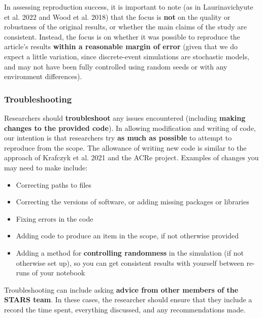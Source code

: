 In assessing reproduction success, it is important to note (as in Laurinavichyute et al. 2022\autocite{laurinavichyute_share_2022} and Wood et al. 2018\autocite{wood_push_2018}) that the focus is \textbf{not} on the quality or robustness of the original results, or whether the main claims of the study are consistent. Instead, the focus is on whether it was possible to reproduce the article's results \textbf{within a reasonable margin of error} (given that we do expect a little variation, since discrete-event simulations are stochastic models, and may not have been fully controlled using random seeds or with any environment differences).

\vspace{0.5cm}
\subsubsection{Troubleshooting}

Researchers should \textbf{troubleshoot} any issues encountered (including \textbf{making changes to the provided code}). In allowing modification and writing of code, our intention is that researchers try \textbf{as much as possible} to attempt to reproduce from the scope. The allowance of writing new code is similar to the approach of Krafczyk et al. 2021\autocite{krafczyk_learning_2021} and the ACRe project\autocite{berkeley_initiative_for_transparency_in_the_social_sciences_guide_2022}. Examples of changes you may need to make include:
\begin{itemize}
    \item Correcting paths to files
    \item Correcting the versions of software, or adding missing packages or libraries
    \item Fixing errors in the code
    \item Adding code to produce an item in the scope, if not otherwise provided
    \item Adding a method for \textbf{controlling randomness} in the simulation (if not otherwise set up), so you can get consistent results with yourself between re-runs of your notebook
\end{itemize}

Troubleshooting can include asking \textbf{advice from other members of the STARS team}. In these cases, the researcher should ensure that they include a record the time spent, everything discussed, and any recommendations made.

\vspace{0.5cm}
